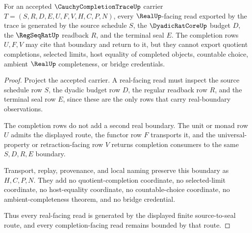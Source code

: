 \begin{theorem}
\label{thm:cauchy-completion-trace-real-boundary}
For an accepted $\CauchyCompletionTraceUp$ carrier $T=(S,R,D,E,U,F,V,H,C,P,N)$, every $\RealUp$-facing read exported by the trace is generated by the source schedule $S$, the $\DyadicRatCoreUp$ budget $D$, the $\RegSeqRatUp$ readback $R$, and the terminal seal $E$. The completion rows $U,F,V$ may cite that boundary and return to it, but they cannot export quotient completions, selected limits, host equality of completed objects, countable choice, ambient $\RealUp$ completeness, or bridge credentials.
\end{theorem}
\begin{proof}
Project the accepted carrier. A real-facing read must inspect the source schedule row $S$, the dyadic budget row $D$, the regular readback row $R$, and the terminal seal row $E$, since these are the only rows that carry real-boundary observations.

The completion rows do not add a second real boundary. The unit or monad row $U$ admits the displayed route, the functor row $F$ transports it, and the universal-property or retraction-facing row $V$ returns completion consumers to the same $S,D,R,E$ boundary.

Transport, replay, provenance, and local naming preserve this boundary as $H,C,P,N$. They add no quotient-completion coordinate, no selected-limit coordinate, no host-equality coordinate, no countable-choice coordinate, no ambient-completeness theorem, and no bridge credential.

Thus every real-facing read is generated by the displayed finite source-to-seal route, and every completion-facing read remains bounded by that route.
\end{proof}


\begin{closurestatus}{\CauchyCompletionTraceUp}
  \theoryclosure{\seedClosure}
  \formalstatus{\unformalizedV}
\end{closurestatus}
